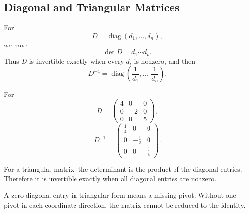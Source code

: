 \subsection{Diagonal and Triangular Matrices}

For
\[
D=\operatorname{diag}(d_1,\ldots,d_n),
\]
we have
\[
\det D=d_1\cdots d_n.
\]
Thus $D$ is invertible exactly when every $d_i$ is nonzero, and then
\[
\boxed{D^{-1}=\operatorname{diag}\left(\frac1{d_1},\ldots,\frac1{d_n}\right)}.
\]

\begin{examplebox}
For
\[
D=\begin{pmatrix}4&0&0\\0&-2&0\\0&0&5\end{pmatrix},
\]
\[
D^{-1}=\begin{pmatrix}\frac14&0&0\\0&-\frac12&0\\0&0&\frac15\end{pmatrix}.
\]
\end{examplebox}

For a triangular matrix, the determinant is the product of the diagonal entries. Therefore it is invertible exactly when all diagonal entries are nonzero.

\begin{interpretationbox}
A zero diagonal entry in triangular form means a missing pivot. Without one pivot in each coordinate direction, the matrix cannot be reduced to the identity.
\end{interpretationbox}
